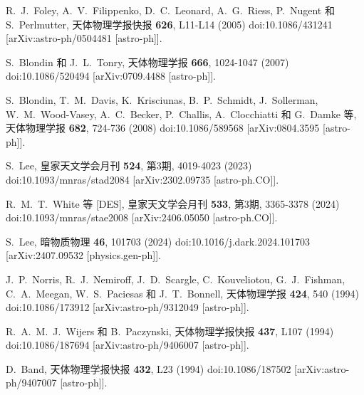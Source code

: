 \documentclass[jkps,preprint,fleqn]{revtex4}
\begin{document}
\begin{thebibliography}{999}
R.~J.~Foley, A.~V.~Filippenko, D.~C.~Leonard, A.~G.~Riess, P.~Nugent 和 S.~Perlmutter,  
天体物理学报快报 \textbf{626}, L11-L14 (2005)  
doi:10.1086/431241  
[arXiv:astro-ph/0504481 [astro-ph]].  

S.~Blondin 和 J.~L.~Tonry,  
天体物理学报 \textbf{666}, 1024-1047 (2007)  
doi:10.1086/520494  
[arXiv:0709.4488 [astro-ph]].  

S.~Blondin, T.~M.~Davis, K.~Krisciunas, B.~P.~Schmidt, J.~Sollerman, W.~M.~Wood-Vasey, A.~C.~Becker, P.~Challis, A.~Clocchiatti 和 G.~Damke 等,  
天体物理学报 \textbf{682}, 724-736 (2008)  
doi:10.1086/589568  
[arXiv:0804.3595 [astro-ph]].  

S.~Lee,  
皇家天文学会月刊 \textbf{524}, 第3期, 4019-4023 (2023)  
doi:10.1093/mnras/stad2084  
[arXiv:2302.09735 [astro-ph.CO]].  

R.~M.~T.~White 等 [DES],  
皇家天文学会月刊 \textbf{533}, 第3期, 3365-3378 (2024)  
doi:10.1093/mnras/stae2008  
[arXiv:2406.05050 [astro-ph.CO]].  

S.~Lee,  
暗物质物理 \textbf{46}, 101703 (2024)  
doi:10.1016/j.dark.2024.101703  
[arXiv:2407.09532 [physics.gen-ph]].  

J.~P.~Norris, R.~J.~Nemiroff, J.~D.~Scargle, C.~Kouveliotou, G.~J.~Fishman, C.~A.~Meegan, W.~S.~Paciesas 和 J.~T.~Bonnell,  
天体物理学报 \textbf{424}, 540 (1994)  
doi:10.1086/173912  
[arXiv:astro-ph/9312049 [astro-ph]].  

R.~A.~M.~J.~Wijers 和 B.~Paczynski,  
天体物理学报快报 \textbf{437}, L107 (1994)  
doi:10.1086/187694  
[arXiv:astro-ph/9406007 [astro-ph]].  

D.~Band,  
天体物理学报快报 \textbf{432}, L23 (1994)  
doi:10.1086/187502  
[arXiv:astro-ph/9407007 [astro-ph]].  


\end{thebibliography}
\end{document}
